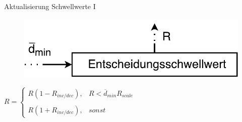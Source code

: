 \documentclass[hyperref={pdfpagelabels=false}]{beamer}
\begin{document}
\begin{frame}{Aktualisierung Schwellwerte I}
	\begin{figure}
		\centering
		\includegraphics[width=.8\linewidth]{./Bilder/threshold_update/threshold_update}
	\end{figure}
	\vspace{2em}
	\begin{center}
		\Large
		$ R = \left\{\begin{array}{ll} R(1-R_{inc/dec}), & R < \overline{d}_{min}R_{scale} \\
		& \\
		R(1+R_{inc/dec}), & sonst\end{array}\right.  $
	\end{center}
	
\end{frame}
\end{document}
